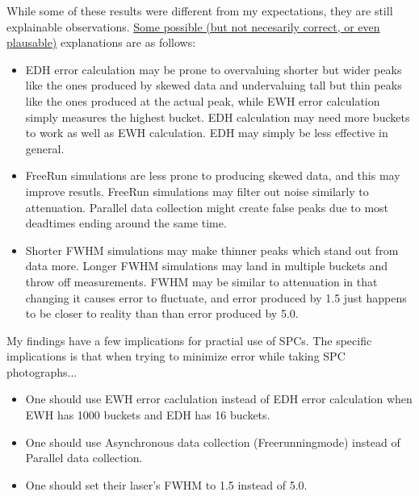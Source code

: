 \documentclass[aspectratio=169]{beamer}
\begin{document}
\begin{frame}
  While some of these results were different from my expectations, they are still explainable observations. \underline{Some possible (but not necesarily correct, or even plausable)} explanations are as follows:
  \begin{itemize}
    \color{Blue}
  \item EDH error calculation may be prone to overvaluing shorter but wider peaks like the ones produced by skewed data and undervaluing tall but thin peaks like the ones produced at the actual peak, while EWH error calculation simply measures the highest bucket. EDH calculation may need more buckets to work as well as EWH calculation. EDH may simply be less effective in general.
  \item FreeRun simulations are less prone to producing skewed data, and this may improve resutls. FreeRun simulations may filter out noise similarly to attenuation. Parallel data collection might create false peaks due to most deadtimes ending around the same time.
  \item Shorter FWHM simulations may make thinner peaks which stand out from data more. Longer FWHM simulations may land in multiple buckets and throw off measurements. FWHM may be similar to attenuation in that changing it causes error to fluctuate, and error produced by 1.5 just happens to be closer to reality than than error produced by 5.0. 
  \end{itemize}
\end{frame}

\begin{frame}
  My findings have a few implications for practial use of SPCs. The specific implications is that when trying to minimize error while taking SPC photographs...
  \begin{itemize}
    \color{Blue}
  \item One should use EWH error caclulation instead of EDH error calculation when EWH has 1000 buckets and EDH has 16 buckets.
  \item One should use Asynchronous data collection (Freerunningmode) instead of Parallel data collection.
  \item One should set their laser's FWHM to 1.5 instead of 5.0.
  \end{itemize}
\end{frame}

\begin{frame}
\end{frame}
\end{document}
